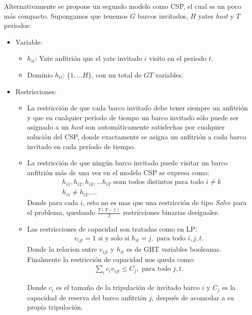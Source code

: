 \documentclass[letter, 10pt]{article}
\begin{document}
Alternativamente se propone un segundo modelo como CSP, el cual es un poco más compacto. Supongamos que tenemos $G$ barcos invitados, $H$ yates \textit{host} y $T$ periodos:
\begin{itemize}
    \item Variable:
    \begin{itemize}
        \item $h_{it}$: Yate anfitrión que el yate invitado $i$ visito en el periodo $t$.
        \item Dominio $h_{it}$: $\{1,\ldots H \}$, con un total de $GT$ variables.
    \end{itemize}
    \item Restricciones:
    \begin{itemize}
        \item La restricción de que cada barco invitado debe tener siempre un anfitrión y que en cualquier período de tiempo un barco invitado sólo puede ser asignado a un \textit{host} son automáticamente satisfechas por cualquier solución del CSP, donde exactamente se asigna un anfitrión a cada barco invitado en cada período de tiempo.
        \item La restricción de que ningún barco invitado puede visitar un barco anfitrión más de una vez en el modelo CSP se expresa como:
        \begin{align*}
            &h_{i1},h_{i2},h_{i3},\ldots h_{iT} \text{ sean todos distintos para todo } i\neq k \\
            &h_{i1} \neq h_{i2}, \ldots 
        \end{align*}
        Donde para cada $i$, esto no es mas que una restricción de tipo \textit{Solve} para el problema, quedando $\displaystyle\frac{T(T-1)}{2}$  restricciones binarias desiguales.
        \item Las restricciones de capacidad son tratadas como en LP:
        \begin{align*}
            v_{ijt} = 1 \text{ si y solo si } h_{it} = j, \text{ para todo } i,j,t.
        \end{align*}
        Donde la relacion entre $v_{ijt}$ y $h_{it}$ es de GHT variables booleanas. Finalmente la restricción de capacidad nos queda como:
        \begin{align*}
            \sum_{i} c_{i}v_{ijt} \leq C_j, \text{ para todo } j,t.
        \end{align*}
        
        Donde $c_i$ es el tamaño de la tripulación de invitado barco $i$ y $C_j$ es la capacidad de reserva del barco anfitrión $j$, después de acomodar a su propia tripulación.
        

\end{itemize}
\end{itemize}
\end{document}
